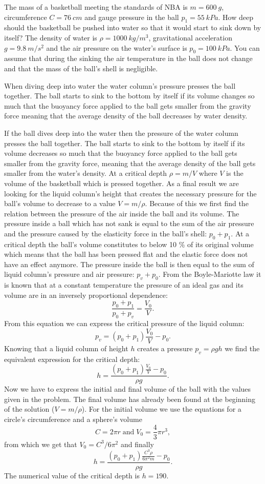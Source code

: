 {\ifEngStatement
The mass of a basketball meeting the standards of NBA is $m=\SI{600}{g}$, circumference $C=\SI{76}{cm}$ and gauge pressure in the ball $p_1=\SI{55}{kPa}$. How deep should the basketball be pushed into water so that it would start to sink down by itself? The density of water is $\rho=\SI{1000}{kg/m^3}$, gravitational acceleration $g=\SI{9,8}{m/s^2}$ and the air pressure on the water's surface is $p_0=\SI{100}{kPa}$. You can assume that during the sinking the air temperature in the ball does not change and that the mass of the ball’s shell is negligible.
\fi


\ifEngHint
When diving deep into water the water column's pressure presses the ball together. The ball starts to sink to the bottom by itself if its volume changes so much that the buoyancy force applied to the ball gets smaller from the gravity force meaning that the average density of the ball decreases by water density.
\fi


\ifEngSolution
If the ball dives deep into the water then the pressure of the water column presses the ball together. The ball starts to sink to the bottom by itself if its volume decreases so much that the buoyancy force applied to the ball gets smaller from the gravity force, meaning that the average density of the ball gets smaller from the water’s density. At a critical depth $\rho=m/V$ where $V$ is the volume of the basketball which is pressed together. As a final result we are looking for the liquid column’s height that creates the necessary pressure for the ball’s volume to decrease to a value $V=m/\rho$. Because of this we first find the relation between the pressure of the air inside the ball and its volume. The pressure inside a ball which has not sank is equal to the sum of the air pressure and the pressure caused by the elasticity force in the ball’s shell: $p_0+p_1$. At a critical depth the ball’s volume constitutes to below 10 \% of its original volume which means that the ball has been pressed flat and the elastic force does not have an effect anymore. The pressure inside the ball is then equal to the sum of liquid column’s pressure and air pressure: $p_v+p_0$. From the Boyle-Mariotte law it is known that at a constant temperature the pressure of an ideal gas and its volume are in an inversely proportional dependence:
\[
\frac{p_0+p_1}{p_0+p_v}=\frac{V_0}{V}.
\]
From this equation we can express the critical pressure of the liquid column:
\[
p_v = (p_0+p_1) \frac{V_0}{V} - p_0.
\] 
Knowing that a liquid column of height $h$ creates a pressure $p_v=\rho g h$ we find the equivalent expression for the critical depth:
\[
h = \frac{(p_0+p_1) \frac{V_0}{V} - p_0}{\rho g}.
\] 
Now we have to express the initial and final volume of the ball with the values given in the problem. The final volume has already been found at the beginning of the solution ($V=m/\rho$). For the initial volume we use the equations for a circle’s circumference and a sphere’s volume
\[
C = 2\pi r \; \text{and} \; V_0 = \frac{4}{3}\pi r^3,
\] 
from which we get that $V_0=C^3/6\pi^2$ and finally
\[
h = \frac{(p_0+p_1) \frac{C^3 \rho}{6\pi^2 m} - p_0}{\rho g}.
\] 
The numerical value of the critical depth is $h=190$.
\fi
}